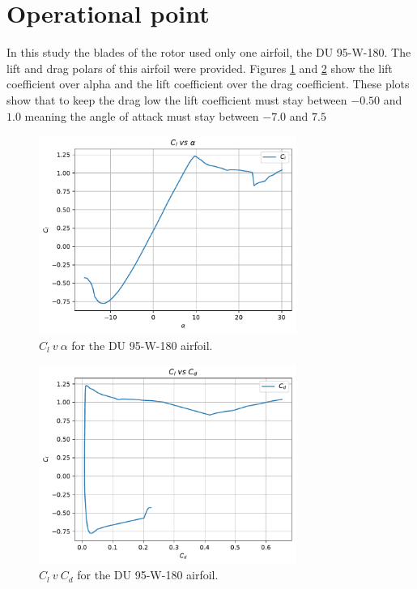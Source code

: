 \section{Operational point}
In this study the blades of the rotor used only one airfoil, the DU 95-W-180. The lift and drag polars of this airfoil were provided. Figures \ref{img:clva} and \ref{img:clvcd} show the lift coefficient over alpha and the lift coefficient over the drag coefficient. These plots show that to keep the drag low the lift coefficient must stay between $-0.50$ and $1.0$ meaning the angle of attack must stay between $-7.0$ and $7.5$

\begin{figure}[htbp]
\includegraphics[width=0.75\textwidth]{./img/yaw/Cl_v_alpha.pdf}
\caption{$C_l\ v\ \alpha$ for the DU 95-W-180 airfoil.}
\centering
\label{img:clva}
\end{figure}
\begin{figure}[htbp]
\includegraphics[width=0.75\textwidth]{./img/yaw/Cd_v_Cl.pdf}
\caption{$C_l\ v\ C_d$ for the DU 95-W-180 airfoil.}
\centering
\label{img:clvcd}
\end{figure}



